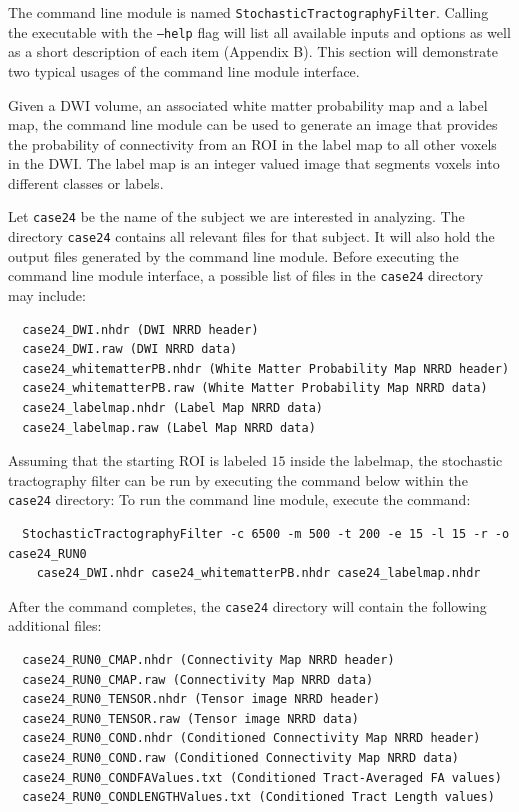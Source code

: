 The command line module is named \texttt{StochasticTractographyFilter}.  Calling the executable with the \texttt{--help} flag will list all available inputs and options as well as a short description of each item (Appendix B).  This section will demonstrate two typical usages of the command line module interface.

Given a DWI volume, an associated white matter probability map and a label map, the command line module can be used to generate an image that provides the probability of connectivity from an ROI in the label map to all other voxels in the DWI.  The label map is an integer valued image that segments voxels into different classes or labels.

Let \texttt{case24} be the name of the subject we are interested in analyzing.  The directory \texttt{case24} contains all relevant files for that subject.  It will also hold the output files generated by the command line module.  Before executing the command line module interface, a possible list of files in the \texttt{case24} directory may include:
\begin{verbatim}
  case24_DWI.nhdr (DWI NRRD header)
  case24_DWI.raw (DWI NRRD data)
  case24_whitematterPB.nhdr (White Matter Probability Map NRRD header)
  case24_whitematterPB.raw (White Matter Probability Map NRRD data)
  case24_labelmap.nhdr (Label Map NRRD data)
  case24_labelmap.raw (Label Map NRRD data)
\end{verbatim}
Assuming that the starting ROI is labeled $15$ inside the labelmap, the stochastic tractography filter can be run by executing the command below within the \texttt{case24} directory: 
To run the command line module, execute the command:
\begin{verbatim}
  StochasticTractographyFilter -c 6500 -m 500 -t 200 -e 15 -l 15 -r -o case24_RUN0
    case24_DWI.nhdr case24_whitematterPB.nhdr case24_labelmap.nhdr
\end{verbatim}
After the command completes, the \texttt{case24} directory will contain the following additional files:
\begin{verbatim}
  case24_RUN0_CMAP.nhdr (Connectivity Map NRRD header)
  case24_RUN0_CMAP.raw (Connectivity Map NRRD data)
  case24_RUN0_TENSOR.nhdr (Tensor image NRRD header)
  case24_RUN0_TENSOR.raw (Tensor image NRRD data)
  case24_RUN0_COND.nhdr (Conditioned Connectivity Map NRRD header)
  case24_RUN0_COND.raw (Conditioned Connectivity Map NRRD data)
  case24_RUN0_CONDFAValues.txt (Conditioned Tract-Averaged FA values)
  case24_RUN0_CONDLENGTHValues.txt (Conditioned Tract Length values)
\end{verbatim}

